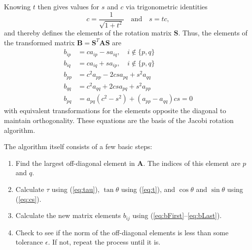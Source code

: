 \documentclass[aps,prc,reprint,nobalancelastpage]{revtex4-1}
\begin{document}
        Knowing $t$ then gives values for $s$ and $c$ via trigonometric identities
        \begin{equation}
            c = \frac{1}{\sqrt{1 + t^2}} \quad \text{and}\quad s = tc, \label{eq:cs}
        \end{equation}
        and thereby defines the elements of the rotation matrix $\mathbf{S}$. Thus, the elements of the transformed matrix $\mathbf{B} = \mathbf{S}^T \mathbf{A} \mathbf{S}$ are
        \begin{align}
            b_{ip} &= ca_{ip} - sa_{iq}, \quad i \notin \{p, q\} \label{eq:bFirst}\\
            b_{iq} &= ca_{iq} + sa_{ip}, \quad i \notin \{p, q\} \\
            b_{pp} &= c^2 a_{pp} - 2csa_{pq} + s^2 a_{qq} \\
            b_{qq} &= c^2 a_{qq} + 2csa_{pq} + s^2 a_{pp} \\
            b_{pq} &= a_{pq}(c^2-s^2) + (a_{pp} - a_{qq}) cs = 0 \label{eq:bLast}
        \end{align}
        with equivalent transformations for the elements opposite the diagonal to maintain orthogonality. These equations are the basis of the Jacobi rotation algorithm.

        The algorithm itself consists of a few basic steps:
        \begin{enumerate}
            \item Find the largest off-diagonal element in $\mathbf{A}$. The indices of this element are $p$ and $q$.
            \item Calculate $\tau$ using (\ref{eq:tau}), $\tan\theta$ using (\ref{eq:t}), and $\cos\theta$ and $\sin\theta$ using (\ref{eq:cs}).
            \item Calculate the new matrix elements $b_{ij}$ using (\ref{eq:bFirst}--\ref{eq:bLast}).
            \item Check to see if the norm of the off-diagonal elements is less than some tolerance $\epsilon$. If not, repeat the process until it is.
        \end{enumerate}
\end{document}
